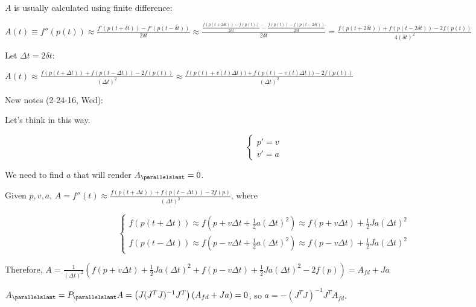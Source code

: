 \documentclass{article}
\begin{document}
$A$ is usually calculated using finite difference:

$A(t) \equiv f''(p(t)) \approx \frac{f'(p(t+\delta t)) - f'(p(t-\delta t))}{2 \delta t} \approx \frac{ \frac{f(p(t+2\delta t)) - f(p(t))}{2 \delta t} - \frac{f(p(t)) - f(p(t-2\delta t))}{2 \delta t}}{2 \delta t} = \frac{f(p(t+2\delta t)) + f(p(t-2\delta t)) - 2f(p(t))}{4 (\delta t)^2}$

Let $\Delta t = 2 \delta t$:

$A(t) \approx \frac{f(p(t+\Delta t)) + f(p(t-\Delta t)) - 2f(p(t))}{(\Delta t)^2} \approx \frac{f(p(t)+v(t)\Delta t)) + f(p(t)-v(t)\Delta t)) - 2f(p(t))}{(\Delta t)^2} $
\newline

New notes (\textcolor{OliveGreen}{2-24-16, Wed}): 

Let's think in this way. 

\begin{equation}
\left    \{
                \begin{array}{ll}
                  p' = v \\
                  v' = a
                \end{array}
              \right.
\end{equation}

We need to find $a$ that will render $A_{\parallelslant}=0$. 

Given $p, v, a$, $A = f''(t) \approx \frac{f(p(t+\Delta t)) + f(p(t-\Delta t)) - 2f(p)}{(\Delta t)^2}$, where

\begin{equation}
\left    \{
                \begin{array}{ll}

f(p(t+\Delta t)) \approx f \left(p + v \Delta t + \frac{1}{2}a (\Delta t)^2 \right) \approx f(p+v \Delta t) + \frac{1}{2} J a (\Delta t)^2 \\

f(p(t-\Delta t)) \approx f \left(p - v \Delta t + \frac{1}{2}a (\Delta t)^2 \right) \approx f(p-v \Delta t) + \frac{1}{2} J a (\Delta t)^2

                \end{array}
              \right.
\end{equation}

Therefore, $A = \frac{1}{(\Delta t)^2}\left( f(p+v \Delta t) + \frac{1}{2} J a (\Delta t)^2 + f(p-v \Delta t) + \frac{1}{2} J a (\Delta t)^2 - 2f(p) \right) = A_{fd} + J a$

$A_{\parallelslant} = P_{\parallelslant} A = \left(J (J^T J)^{-1} J^T\right) \left(A_{fd} + J a \right) = 0$, so $\boxed{a=-(J^T J)^{-1} J^T A_{fd}}$. 
\newline
\end{document}
